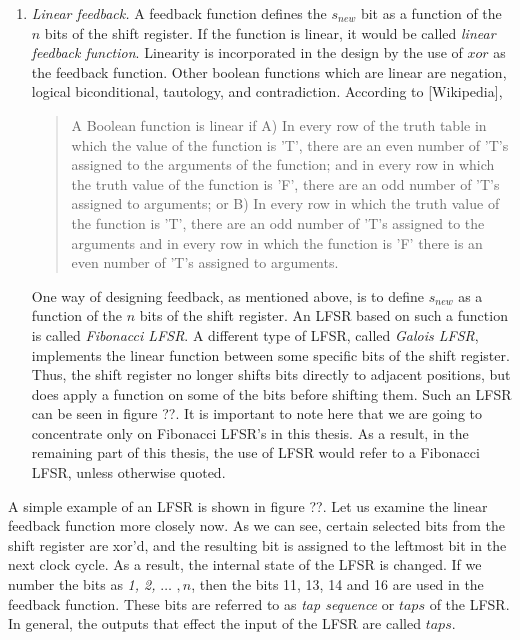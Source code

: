 \begin{enumerate}

\item \emph{Linear feedback.} A feedback function defines the $s_{new}$ bit as a function of the $n$ bits of the shift register. If the function is linear, it would be called \emph{linear feedback function}. Linearity is incorporated in the design by the use of $xor$ as the feedback function. Other boolean functions which are linear are negation, logical biconditional, tautology, and contradiction. According to [Wikipedia], 
\begin{quote}
A Boolean function is linear if A) In every row of the truth table in which the value of the function is 'T', there are an even number of 'T's assigned to the arguments of the function; and in every row in which the truth value of the function is 'F', there are an odd number of 'T's assigned to arguments; or B) In every row in which the truth value of the function is 'T', there are an odd number of 'T's assigned to the arguments and in every row in which the function is 'F' there is an even number of 'T's assigned to arguments.
\end{quote}

One way of designing feedback, as mentioned above, is to define $s_{new}$ as a function of the $n$ bits of the shift register. An LFSR based on such a function is called \emph{Fibonacci LFSR}. A different type of LFSR, called \emph{Galois LFSR}, implements the linear function between some specific bits of the shift register. Thus, the shift register no longer shifts bits directly to adjacent positions, but does apply a function on some of the bits before shifting them. Such an LFSR can be seen in figure ??. It is important to note here that we are going to concentrate only on Fibonacci LFSR's in this thesis. As a result, in the remaining part of this thesis, the use of LFSR would refer to a Fibonacci LFSR, unless otherwise quoted.


\end{enumerate}

A simple example of an LFSR is shown in figure ??. Let us examine the linear feedback function more closely now. As we can see, certain selected bits from the shift register are xor'd, and the resulting bit is assigned to the leftmost bit in the next clock cycle. As a result, the internal state of the LFSR is changed. If we number the bits as \emph{1, 2,} $\ldots$ $, n$, then the bits 11, 13, 14 and 16 are used in the feedback function. These bits are referred to as \emph{tap sequence} or $taps$ of the LFSR. In general, the outputs that effect the input of the LFSR are called $taps$.

